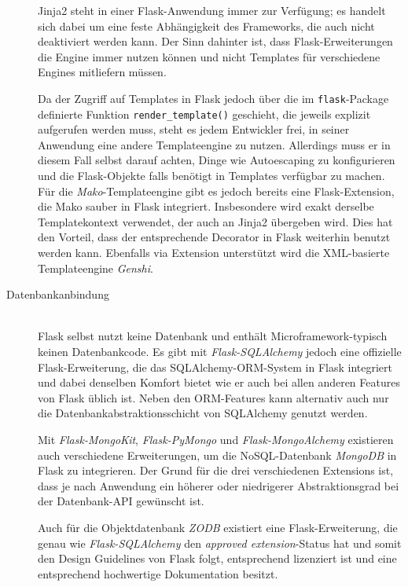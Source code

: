 \begin{description}
Jinja2 steht in einer Flask-Anwendung immer zur Verfügung; es handelt sich dabei um eine feste
Abhängigkeit des Frameworks, die auch nicht deaktiviert werden kann. Der Sinn dahinter ist, dass
Flask-Erweiterungen die Engine immer nutzen können und nicht Templates für verschiedene Engines
mitliefern müssen.

Da der Zugriff auf Templates in Flask jedoch über die im \lstinline{flask}-Package definierte
Funktion \lstinline{render_template()} geschieht, die jeweils explizit aufgerufen werden muss, steht
es jedem Entwickler frei, in seiner Anwendung eine andere Templateengine zu nutzen. Allerdings muss
er in diesem Fall selbst darauf achten, Dinge wie Autoescaping zu konfigurieren und die
Flask-Objekte falls benötigt in Templates verfügbar zu machen. Für die \emph{Mako}-Templateengine
gibt es jedoch bereits eine Flask-Extension, die Mako sauber in Flask integriert. Insbesondere wird
exakt derselbe Templatekontext verwendet, der auch an Jinja2 übergeben wird. Dies hat den Vorteil,
dass der entsprechende Decorator in Flask weiterhin benutzt werden kann. Ebenfalls via Extension
unterstützt wird die XML-basierte Templateengine \emph{Genshi}.


\item[Datenbankanbindung] \hfill \\
Flask selbst nutzt keine Datenbank und enthält Microframework-typisch keinen Datenbankcode. Es gibt
mit \emph{Flask-SQLAlchemy} jedoch eine offizielle Flask-Erweiterung, die das SQLAlchemy-ORM-System
in Flask integriert und dabei denselben Komfort bietet wie er auch bei allen anderen Features von
Flask üblich ist. Neben den ORM-Features kann alternativ auch nur die Datenbankabstraktionsschicht
von SQLAlchemy genutzt werden.

Mit \emph{Flask-MongoKit}, \emph{Flask-PyMongo} und \emph{Flask-MongoAlchemy} existieren auch
verschiedene Erweiterungen, um die NoSQL-Datenbank \emph{MongoDB} in Flask zu integrieren. Der Grund
für die drei verschiedenen Extensions ist, dass je nach Anwendung ein höherer oder niedrigerer
Abstraktionsgrad bei der Datenbank-API gewünscht ist.

Auch für die Objektdatenbank \emph{ZODB} existiert eine Flask-Erweiterung, die genau wie
\emph{Flask-SQLAlchemy} den \emph{approved extension}-Status hat und somit den Design Guidelines von
Flask folgt, entsprechend lizenziert ist und eine entsprechend hochwertige Dokumentation besitzt.



\end{description}
